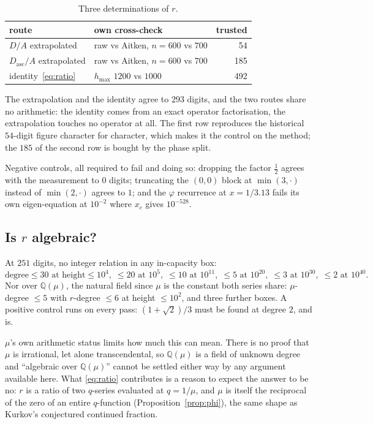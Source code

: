 \documentclass[11pt]{article}
\newcommand{\Q}{\mathbb{Q}}
\begin{document}
\begin{table}[H]
\centering\small
\begin{tabular}{l l r}
\toprule
route & own cross-check & trusted \\
\midrule
$D/A$ extrapolated & raw vs Aitken, $n=600$ vs $700$ & 54 \\
$D_{\mathrm{asc}}/A$ extrapolated & raw vs Aitken, $n=600$ vs $700$ & 185 \\
identity~\eqref{eq:ratio} & $h_{\max}$ $1200$ vs $1000$ & 492 \\
\bottomrule
\end{tabular}
\caption{Three determinations of $r$.}
\label{tab:ratio}
\end{table}

The extrapolation and the identity agree to $293$ digits, and the two routes
share no arithmetic: the identity comes from an exact operator factorisation,
the extrapolation touches no operator at all. The first row reproduces the
historical $54$-digit figure character for character, which makes it the control
on the method; the $185$ of the second row is bought by the phase split.

Negative controls, all required to fail and doing so: dropping the factor
$\tfrac12$ agrees with the measurement to $0$ digits; truncating the $(0,0)$
block at $\min(3,\cdot)$ instead of $\min(2,\cdot)$ agrees to $1$; and the
$\varphi$ recurrence at $x = 1/3.13$ fails its own eigen-equation at $10^{-2}$
where $x_c$ gives $10^{-528}$.

\subsection{Is \texorpdfstring{$r$}{r} algebraic?}
\label{sec:ralg}

At $251$ digits, no integer relation in any in-capacity box:
\[
  \text{degree} \le 30 \text{ at height} \le 10^4, \;\le 20 \text{ at } 10^5,
  \;\le 10 \text{ at } 10^{11}, \;\le 5 \text{ at } 10^{20},
  \;\le 3 \text{ at } 10^{30}, \;\le 2 \text{ at } 10^{40}.
\]
Nor over $\Q(\mu)$, the natural field since $\mu$ is the constant both series
share: $\mu$-degree $\le 5$ with $r$-degree $\le 6$ at height $\le 10^2$, and
three further boxes. A positive control runs on every pass: $(1+\sqrt2)/3$
must be found at degree $2$, and is.

$\mu$'s own arithmetic status limits how much this can mean. There is no
proof that $\mu$ is irrational, let alone transcendental, so $\Q(\mu)$ is a
field of unknown degree and ``algebraic over $\Q(\mu)$'' cannot be settled
either way by any argument available here. What \eqref{eq:ratio} contributes is
a reason to expect the answer to be no: $r$ is a ratio of two $q$-series
evaluated at $q = 1/\mu$, and $\mu$ is itself the reciprocal of the zero of an
entire $q$-function (Proposition~\ref{prop:phi}), the same shape as Kurkov's
conjectured continued fraction.
\end{document}
